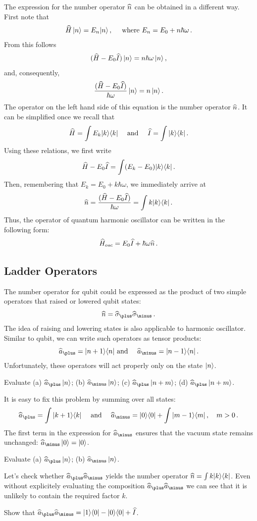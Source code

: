The expression for the number operator $\widehat{n}$ can be obtained in a different way. First note that
\[
\widehat{H}\,|{n}\rangle=E_n|{n}\rangle\,,\quad\textrm{ where } E_n = E_0 + n\hbar\omega\,.
\]
From this follows
\[
(\widehat{H}-E_0\widehat{I})\,|{n}\rangle=n\hbar\omega\,|{n}\rangle\,,
\]
and, consequently, 
\[
\frac{(\widehat{H}-E_0\widehat{I})}{\hbar\omega}\,|{n}\rangle=n\,|{n}\rangle\,.
\]
The operator on the left hand side of this equation is the number operator $\widehat{n}$. It can be simplified once we recall that
\[
\widehat{H}=\int E_k|{k}\rangle\langle{k}|\quad\textrm{ and }\quad \widehat{I}=\int|{k}\rangle\langle{k}|\,.
\]
Using these relations, we first write
\[
\widehat{H}-E_0\widehat{I}=\int (E_k-E_0)|{k}\rangle\langle{k}|\,.
\]
Then, remembering that $E_k=E_0+k\hbar\omega$, we immediately arrive at
\[
\widehat{n}=\frac{(\widehat{H}-E_0\widehat{I})}{\hbar\omega}=\int k|{k}\rangle\langle{k}|\,.
\]
Thus, the operator of quantum harmonic oscillator can be written in the following form:
\[
\widehat{H}_{osc}=E_0\widehat{I}+\hbar\omega\widehat{n}\,.
\]
\subsection{Ladder Operators}
The number operator for qubit could be expressed as the product of two simple operators that raised or lowered qubit states:
\[
\op{n} = \op{\sigma}_\plus\op{\sigma}_\minus\,.
\]
The idea of raising and lowering states is also applicable to harmonic oscillator. Similar to qubit, we can write such operators as tensor products:
\[
\op{a}_\plus = \ketbra{n+1}{n}\textrm{ and }\quad\op{a}_\minus=\ketbra{n-1}{n}\,.
\]
Unfortunately, these operators will act properly only on the state $|{n}\rangle$.
\begin{exercise}
	Evaluate (a) $\op{a}_\plus \,\ket{n}$; (b) $\op{a}_\minus \,\ket{n}$; (c) $\op{a}_\plus \,\ket{n+m}$; (d) $\op{a}_\plus \,\ket{n+m}$.
\end{exercise}
It is easy to fix this problem by summing over all states:
\[
\op{a}_\plus=\int \ketbra{k+1}{k}\quad\textrm{ and }\quad \op{a}_\minus=\ketbra{0}{0}+\int \ketbra{m-1}{m}\,,\quad m > 0\,.
\]
The first term in the expression for $\op{a}_\minus$ ensures that the vacuum state remains unchanged: $\op{a}_\minus\,\ket{0}=\ket{0}$.
\begin{exercise}
	Evaluate (a) $\op{a}_\plus \,\ket{n}$; (b) $\op{a}_\minus \,\ket{n}$.
\end{exercise}
Let's check whether $\op{a}_\plus\op{a}_\minus$ yields the number operator $\widehat{n}=\int k|{k}\rangle\langle{k}|$. Even without explicitely evaluating the composition $\op{a}_\plus\op{a}_\minus$ we can see that it is unlikely to contain the required factor $k$.
\begin{exercise}
	Show that $\op{a}_\plus\op{a}_\minus=\ketbra{1}{0}-\ketbra{0}{0}+\op{I}$.
\end{exercise}

